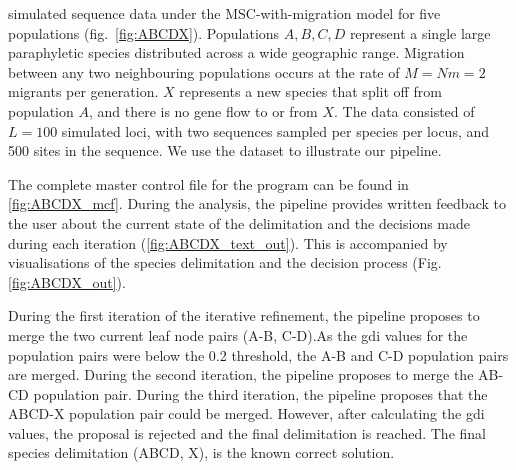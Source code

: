 \documentclass[A4]{article1}
\begin{document}
\citet{Leache2019} simulated sequence data under the MSC-with-migration model for five
populations (fig.~\ref{fig:ABCDX}).  Populations $A, B, C, D$ represent a single
large paraphyletic species distributed across a wide geographic range.  Migration
between any two neighbouring populations occurs at the rate of $M = Nm = 2$ migrants per
generation. $X$ represents a new species that split off from population $A$, and there
is no gene flow to or from $X$.  The data consisted of $L=100$
simulated loci, with two sequences sampled per species per locus, and 500 sites in the
sequence.  We use the dataset to illustrate our pipeline. 

The complete master control file for the program can be found in \ref{fig:ABCDX_mcf}. 
During the analysis, the pipeline provides written feedback to the user about the current state of the
delimitation and the decisions made during each iteration (\ref{fig:ABCDX_text_out}).
This is accompanied by visualisations of the species delimitation and the decision process (Fig. \ref{fig:ABCDX_out}).

During the first iteration of the iterative refinement, the pipeline proposes to merge the
two current leaf node pairs (A-B, C-D).As the gdi values for the population pairs were below the 0.2 threshold, the A-B and C-D population pairs are
merged. During the second iteration, the pipeline proposes to merge the AB-CD population pair. 
During the third iteration, the pipeline proposes that the ABCD-X population pair could be
merged. However, after calculating the gdi values, the proposal is rejected and the final delimitation is reached. 
The final species delimitation (ABCD, X), is the known correct solution.
\end{document}
